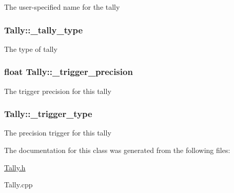 The user-\/specified name for the tally \hypertarget{classTally_afbacc20607dc0b3fd997d9f18da454ac}{
\subsubsection[{\-\_\-tally\-\_\-type}]{ Tally\-::\-\_\-tally\-\_\-type\hspace{0.3cm}{\ttfamily [protected]}}}\label{classTally_afbacc20607dc0b3fd997d9f18da454ac}
The type of tally \hypertarget{classTally_a3c0580f9c5687a77514c9befa61bb22a}{
\subsubsection[{\-\_\-trigger\-\_\-precision}]{\setlength{\rightskip}{0pt plus 5cm}float Tally\-::\-\_\-trigger\-\_\-precision\hspace{0.3cm}{\ttfamily [protected]}}}\label{classTally_a3c0580f9c5687a77514c9befa61bb22a}
The trigger precision for this tally \hypertarget{classTally_a93e93ae8e943327d04e4a041c7f4de8c}{
\subsubsection[{\-\_\-trigger\-\_\-type}]{ Tally\-::\-\_\-trigger\-\_\-type\hspace{0.3cm}{\ttfamily [protected]}}}\label{classTally_a93e93ae8e943327d04e4a041c7f4de8c}
The precision trigger for this tally 

The documentation for this class was generated from the following files\-:\begin{DoxyCompactItemize}
\item 
\hyperlink{Tally_8h}{Tally.\-h}\item 
Tally.\-cpp\end{DoxyCompactItemize}
